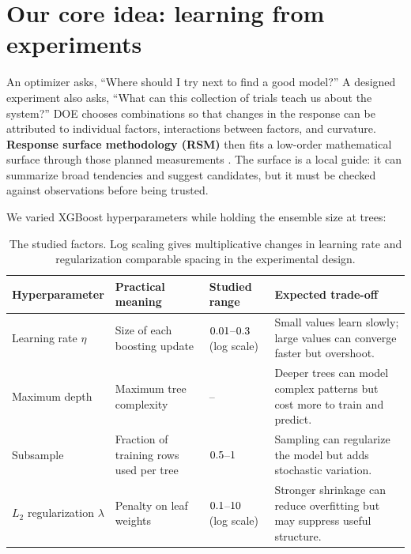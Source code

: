 \documentclass[12pt,a4paper]{article}
\newcommand{\term}[1]{\textbf{#1}}
\begin{document}
\section{Our core idea: learning from experiments}
An optimizer asks, ``Where should I try next to find a good model?'' A designed experiment also asks, ``What can this collection of trials teach us about the system?'' DOE chooses combinations so that changes in the response can be attributed to individual factors, interactions between factors, and curvature. \term{Response surface methodology (RSM)} then fits a low-order mathematical surface through those planned measurements \cite{box1951experimental,myers2016response}. The surface is a local guide: it can summarize broad tendencies and suggest candidates, but it must be checked against observations before being trusted.

We varied \numPubFactors{} XGBoost hyperparameters while holding the ensemble size at \numPubTrees{} trees:
\begin{table}[tbp]
\centering
\small
\renewcommand{\arraystretch}{1.2}
\begin{tabular}{p{}p{}p{}p{}}
\toprule
\textbf{Hyperparameter} & \textbf{Practical meaning} & \textbf{Studied range} & \textbf{Expected trade-off} \\
\midrule
Learning rate $\eta$ & Size of each boosting update & $0.01$--$0.3$ (log scale) & Small values learn slowly; large values can converge faster but overshoot. \\
Maximum depth & Maximum tree complexity & \numPubDepthLow{}--\numPubDepthHigh{} & Deeper trees can model complex patterns but cost more to train and predict. \\
Subsample & Fraction of training rows used per tree & $0.5$--$1$ & Sampling can regularize the model but adds stochastic variation. \\
$L_2$ regularization $\lambda$ & Penalty on leaf weights & $0.1$--$10$ (log scale) & Stronger shrinkage can reduce overfitting but may suppress useful structure. \\
\bottomrule
\end{tabular}
\caption{The \numPubFactors{} studied factors. Log scaling gives multiplicative changes in learning rate and regularization comparable spacing in the experimental design.}
\label{tab:factors}
\end{table}
\end{document}
